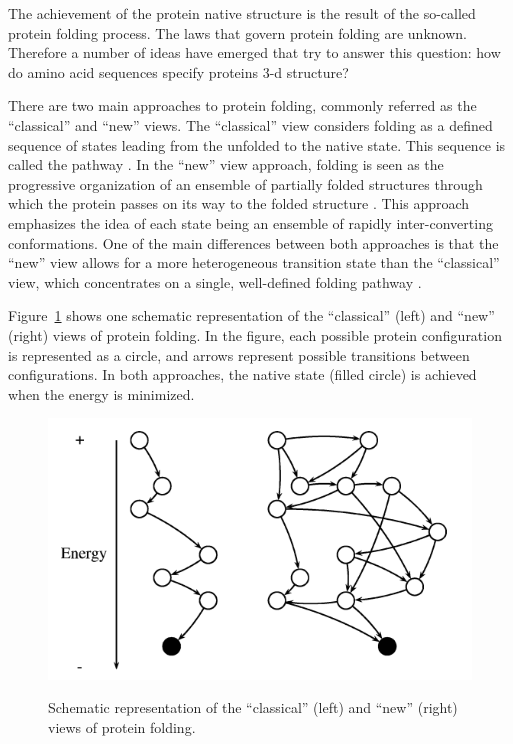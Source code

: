 The achievement of the protein native structure is the result of the so-called protein folding process. The laws that govern protein folding are unknown. Therefore a number of ideas have emerged that try to answer this question: how do amino acid sequences specify proteins 3-d structure?


There are two main approaches to protein folding, commonly referred as the ``classical'' and ``new'' views. The ``classical'' view considers folding as a defined sequence of states leading from the unfolded to the native state. This sequence is called the pathway \cite{pande:1998}. In the  ``new'' view approach, folding is seen as the progressive organization of an ensemble of partially folded structures through which the protein passes on its way to the folded structure \cite{onuchic:2004}. This approach emphasizes the idea of each state being an ensemble of rapidly inter-converting conformations. One of the main differences between both approaches is that the ``new'' view allows for a more heterogeneous transition state than the ``classical'' view, which concentrates on a single, well-defined folding pathway \cite{baker:2000}.


Figure~\ref{fig:protviews} shows one schematic representation of the ``classical'' (left) and  ``new'' (right) views of protein folding. In the figure, each possible protein configuration is represented as a circle, and arrows represent possible transitions between configurations. In both approaches, the native state (filled circle) is achieved when the energy is minimized.

\begin{figure}[htb!]
	\includegraphics[scale=.6]{figures/protviews.png}
	\label{fig:protviews}
	\caption{Schematic representation of the “classical” (left) and “new” (right)
		views of protein folding.}
\end{figure}


